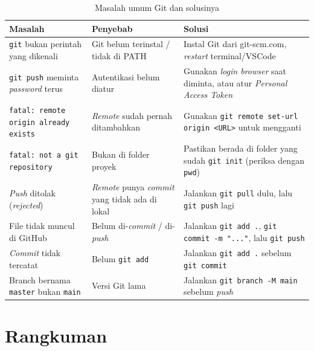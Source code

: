 \begin{table}[h!]
\centering
\caption{Masalah umum Git dan solusinya}
\label{tab:trouble-08}
\begin{tabular}{|p{3.5cm}|p{4cm}|p{5cm}|}
\hline
\textbf{Masalah} & \textbf{Penyebab} & \textbf{Solusi} \\
\hline
\texttt{git} bukan perintah yang dikenali & Git belum terinstal / tidak di PATH & Instal Git dari git-scm.com, \emph{restart} terminal/VSCode \\
\hline
\texttt{git push} meminta \emph{password} terus & Autentikasi belum diatur & Gunakan \emph{login browser} saat diminta, atau atur \emph{Personal Access Token} \\
\hline
\texttt{fatal: remote origin already exists} & \emph{Remote} sudah pernah ditambahkan & Gunakan \texttt{git remote set-url origin <URL>} untuk mengganti \\
\hline
\texttt{fatal: not a git repository} & Bukan di folder proyek & Pastikan berada di folder yang sudah \texttt{git init} (periksa dengan \texttt{pwd}) \\
\hline
\emph{Push} ditolak (\emph{rejected}) & \emph{Remote} punya \emph{commit} yang tidak ada di lokal & Jalankan \texttt{git pull} dulu, lalu \texttt{git push} lagi \\
\hline
File tidak muncul di GitHub & Belum di-\emph{commit} / di-\emph{push} & Jalankan \texttt{git add .}, \texttt{git commit -m "..."}, lalu \texttt{git push} \\
\hline
\emph{Commit} tidak tercatat & Belum \texttt{git add} & Jalankan \texttt{git add .} sebelum \texttt{git commit} \\
\hline
Branch bernama \texttt{master} bukan \texttt{main} & Versi Git lama & Jalankan \texttt{git branch -M main} sebelum \emph{push} \\
\hline
\end{tabular}
\end{table}

\section{Rangkuman}
\label{sec:git-rangkuman}

